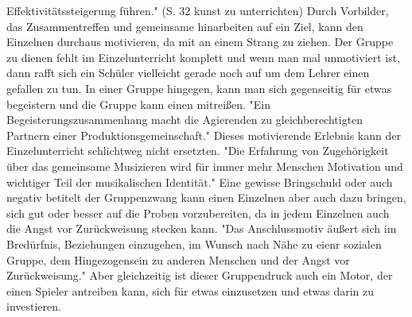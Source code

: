Effektivitätssteigerung führen." (S. 32 kunst zu unterrichten) Durch Vorbilder,
das Zusammentreffen und gemeinsame hinarbeiten auf ein Ziel, kann den Einzelnen
durchaus motivieren, da mit an einem Strang zu ziehen. Der Gruppe zu dienen
fehlt im Einzelunterricht komplett und wenn man mal unmotiviert ist, dann rafft
sich ein Schüler vielleicht gerade noch auf um dem Lehrer einen gefallen zu tun.
In einer Gruppe hingegen, kann man sich gegenseitig für etwas begeistern und die
Gruppe kann einen mitreißen. "Ein Begeisterungszusammenhang macht die Agierenden
zu gleichberechtigten Partnern einer Produktionsgemeinschaft."
\autocite[198]{busch:grundwissen_instrumentalpaedagogik} Dieses motivierende
Erlebnis kann der Einzelunterricht schlichtweg nicht ersetzten. "Die Erfahrung
von Zugehörigkeit über das gemeinsame Musizieren wird für immer mehr Menschen
Motivation und wichtiger Teil der musikalischen Identität."
\autocite[123]{mitzscherlich:musikpsychologie} Eine gewisse Bringschuld oder
auch negativ betitelt der Gruppenzwang kann einen Einzelnen aber auch dazu
bringen, sich gut oder besser auf die Proben vorzubereiten, da in jedem
Einzelnen auch die Angst vor Zurückweisung stecken kann. "Das Anschlussmotiv
äußert sich im Bredürfnis, Beziehungen einzugehen, im Wunsch nach Nähe zu eienr
sozialen Gruppe, dem Hingezogensein zu anderen Menschen und der Angst vor
Zurückweisung." \autocite[120ff]{losert:die_kunst_zu_unterrichten} Aber
gleichzeitig ist dieser Gruppendruck auch ein Motor, der einen Spieler antreiben
kann, sich für etwas einzusetzen und etwas darin zu investieren.









